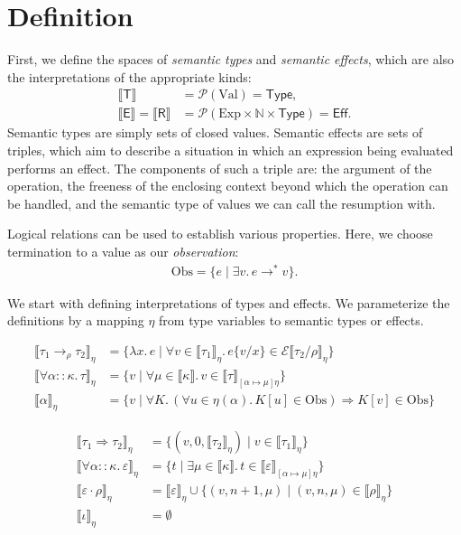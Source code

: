 \documentclass[a4paper, 12pt]{report}
\newcommand{\subst}[2]{\{#1/#2\}}
\newcommand{\E}{\mathcal{E}}
\newcommand{\kT}{\mathsf{T}}
\newcommand{\kE}{\mathsf{E}}
\newcommand{\kR}{\mathsf{R}}
\newcommand{\Obs}{\mathrm{Obs}}
\newcommand{\+}{\enspace}
\begin{document}
\section{Definition}

First, we define the spaces of \textit{semantic types} and \textit{semantic effects},
which are also the interpretations of the appropriate kinds:
\begin{align*}
	⟦\kT⟧ &= \mathcal{P}(\textrm{Val}) = \mathsf{Type},\\
	⟦\kE⟧=⟦\kR⟧ &= \mathcal{P}(\textrm{Exp}×ℕ×\mathsf{Type}) = \mathsf{Eff}.
\end{align*}
Semantic types are simply sets of closed values.
Semantic effects are sets of triples, which aim to describe a situation
in which an expression being evaluated performs an effect.
The components of such a triple are:
the argument of the operation,
the freeness of the enclosing context beyond which the operation can be handled,
and the semantic type of values we can call the resumption with.

Logical relations can be used to establish various properties.
Here, we choose termination to a value as our \textit{observation}:
\begin{align*}
	\Obs = \{ e \mid ∃v.\, e →^* v \}.
\end{align*}

We start with defining interpretations of types and effects.
We parameterize the definitions by a mapping $η$ from type variables to
semantic types or effects.

\begin{align*}
	⟦τ_1 →_ρ τ_2⟧_η
	 &= \{ λx.\,e \mid ∀v∈⟦τ_1⟧_η.\, e\subst{v}{x} ∈ \E⟦τ_2/ρ⟧_η \} \\
	⟦∀α::κ.\,τ⟧_η
	&= \{ v \mid ∀μ∈⟦κ⟧.\, v ∈ ⟦τ⟧_{[α↦μ]η} \} \\
	⟦α⟧_η &= \{ v \mid ∀K.\, (∀u∈η(α).\, K[u]∈\Obs) ⇒ K[v]∈\Obs \}
\end{align*}

\begin{align*}
	⟦τ_1 \Rightarrow τ_2⟧_η &= \{(v,0,⟦τ_2⟧_η) \mid v∈⟦τ_1⟧_η \} \\
	⟦∀α::κ.\,ε⟧_η &= \{t \mid ∃μ∈⟦κ⟧.\, t∈⟦ε⟧_{[α↦μ]η} \} \\
	⟦ε · ρ⟧_η &= ⟦ε⟧_η ∪ \{(v, n+1, μ) \mid (v, n, μ)∈⟦ρ⟧_η \} \\
	⟦ι⟧_η &= ∅
\end{align*}
\end{document}
